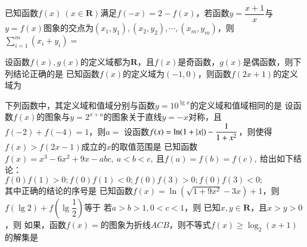\documentclass{BHCexam}
\begin{document}
\fubiaoti{}
\maketitle
\begin{questions}
\question
已知函数$f(x)~(x\in \mathbf{R})$满足$f(-x)=2-f(x)$，若函数$y=\dfrac{x+1}{x}$与$y=f(x)$图象的交点为$(x_1,y_1),(x_2,y_2),\cdots,(x_m,y_m)$，则$\sum\limits_{i=1}^{m}(x_i+y_i)=$\xx
{}

\question
设函数$f(x),g(x)$的定义域都为$\mathbf{R}$，且$f(x)$是奇函数，$g(x)$是偶函数，则下列结论正确的是\xx
{}
\question
已知函数$f(x)$的定义域为$(-1,0)$，则函数$f(2x+1)$的定义域为\xx
{}

\qs 下列函数中，其定义域和值域分别与函数$y=10^{\lg x}$的定义域和值域相同的是\xx
{}
	\qs
设函数$f(x)$的图象与$y=2^{x+a}$的图象关于直线$y=-x$对称，且$f(-2)+f(-4)=1$，则$a=$\mbox{\hspace{1pt}}\hfill\xx
{}
\qs 设函数$f(x)=\ln (1+\left|x\right|)-\dfrac{1}{1+x^2}$，则使得$f(x)>f(2x-1)$成立的$x$的取值范围是\xx
{}
\qs 已知函数$f(x)=x^3-6x^2+9x-abc,~a<b<c,~$且$ f(a)=f(b)=f(c) ,~$给出如下结论：\\
 $ f(0)f(1)>0 ;$\quad {}$f(0)f(1)<0;$\quad {}$f(0)f(3)>0;$\quad {}$f(0)f(3)<0;$\\
其中正确的结论的序号是\xx
{}
\qs 已知函数$f(x)=\ln \left(\sqrt{1+9x^2}-3x\right)+1$，则$ f(\lg2)+f\left(\lg\dfrac{1}{2}\right) $等于\xx
{}
\qs 若$ a>b>1,0<c<1 $，则\xx
{}
\qs 已知$ x,y\in \mathbf{R} $，且$ x>y>0 $，则\xx
{}
\qs 如果，函数$f(x)=$的图象为折线$ ACB $，则不等式$ f(x)\ge \log_2(x+1) $的解集是\xx


\end{questions}
\end{document}
